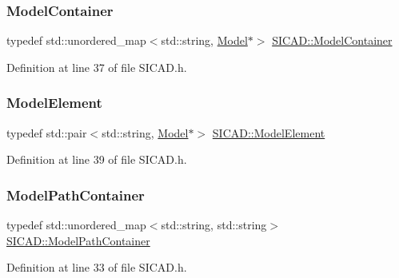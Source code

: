\subsubsection{\texorpdfstring{Model\+Container}{ModelContainer}}
{\footnotesize\ttfamily typedef std\+::unordered\+\_\+map$<$std\+::string, \mbox{\hyperlink{classModel}{Model}}$\ast$$>$ \mbox{\hyperlink{classSICAD_aca3c9693d298f2e8dc171194c6a7507c}{S\+I\+C\+A\+D\+::\+Model\+Container}}}



Definition at line 37 of file S\+I\+C\+A\+D.\+h.

\mbox{\label{classSICAD_af999665097d7cdf11780735bf24a6956}} 
\subsubsection{\texorpdfstring{Model\+Element}{ModelElement}}
{\footnotesize\ttfamily typedef std\+::pair$<$std\+::string, \mbox{\hyperlink{classModel}{Model}}$\ast$$>$ \mbox{\hyperlink{classSICAD_af999665097d7cdf11780735bf24a6956}{S\+I\+C\+A\+D\+::\+Model\+Element}}}



Definition at line 39 of file S\+I\+C\+A\+D.\+h.

\mbox{\label{classSICAD_a9e1e1460d4c0f331b4fd015aae4dd721}} 
\subsubsection{\texorpdfstring{Model\+Path\+Container}{ModelPathContainer}}
{\footnotesize\ttfamily typedef std\+::unordered\+\_\+map$<$std\+::string, std\+::string$>$ \mbox{\hyperlink{classSICAD_a9e1e1460d4c0f331b4fd015aae4dd721}{S\+I\+C\+A\+D\+::\+Model\+Path\+Container}}}



Definition at line 33 of file S\+I\+C\+A\+D.\+h.

\mbox{\label{classSICAD_a5148c8a96c82625706ce2e5b86b52dd7}} 
